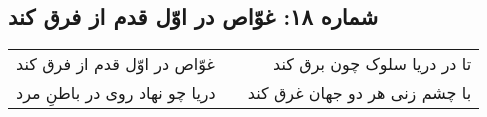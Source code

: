 \begin{center}
\section*{شماره ۱۸: غوّاص در اوّل قدم از فرق کند}
\label{sec:018}
\begin{longtable}{l p{0.5cm} r}
غوّاص در اوّل قدم از فرق کند
&&
تا در دریا سلوک چون برق کند
\\
دریا چو نهاد روی در باطنِ مرد
&&
با چشم زنی هر دو جهان غرق کند
\\
\end{longtable}
\end{center}
